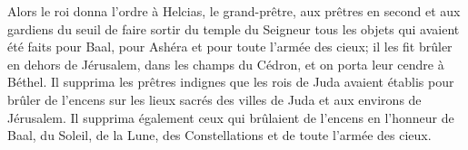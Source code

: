Alors le roi donna l’ordre à Helcias, le grand-prêtre,
	aux prêtres en second et aux gardiens du seuil
	de faire sortir du temple du Seigneur tous les objets qui avaient été faits
		pour Baal, pour Ashéra et pour toute l’armée des cieux;
	il les fit brûler en dehors de Jérusalem, dans les champs du Cédron,
	et on porta leur cendre à Béthel.
Il supprima les prêtres indignes que les rois de Juda avaient établis
	pour brûler de l’encens sur les lieux sacrés des villes de Juda
	et aux environs de Jérusalem.
Il supprima également ceux qui brûlaient de l’encens en l’honneur de Baal,
		du Soleil, de la Lune, des Constellations et de toute l’armée des cieux.
